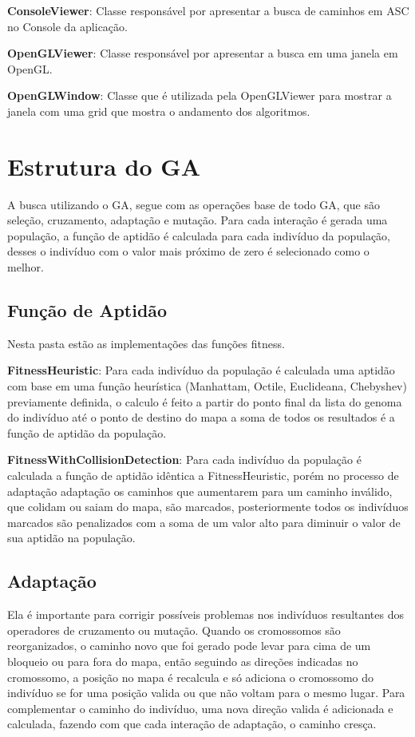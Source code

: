  \textbf{ConsoleViewer}: Classe responsável por apresentar a busca de caminhos em ASC no Console da aplicação.
 
 \textbf{OpenGLViewer}: Classe responsável por apresentar a busca em uma janela em OpenGL.
 
 \textbf{OpenGLWindow}: Classe que é utilizada pela OpenGLViewer para mostrar a janela com uma grid que mostra o andamento dos algoritmos.
 
 \section{Estrutura do GA}
 
 A busca utilizando o GA, segue com as operações base de todo GA, que são seleção, cruzamento, adaptação e mutação. 
 Para cada interação é gerada uma população, a função de aptidão é calculada para cada indivíduo da população, 
 desses o indivíduo com o valor mais próximo de zero é selecionado como o melhor.
 
 \subsection{Função de Aptidão}
 
 Nesta pasta estão as implementações das funções fitness.
 
 \textbf{FitnessHeuristic}: Para cada indivíduo da população é calculada uma aptidão com base em uma função heurística (Manhattam, Octile, Euclideana, Chebyshev)
 previamente definida, o calculo é feito a partir do ponto final da lista do genoma do indivíduo até o ponto de destino do mapa
 a soma de todos os resultados é a função de aptidão da população.
 
 \textbf{FitnessWithCollisionDetection}: Para cada indivíduo da população é calculada a função de aptidão idêntica a FitnessHeuristic, porém no processo de adaptação adaptação os caminhos que aumentarem para um caminho inválido, que colidam ou saiam do mapa, são marcados,
 posteriormente todos os indivíduos marcados são penalizados com a  soma de  um valor alto para diminuir o valor de sua aptidão na população.
 
 \subsection{Adaptação}
 
 Ela é importante para corrigir possíveis problemas nos indivíduos resultantes dos operadores de cruzamento ou mutação. Quando os cromossomos são reorganizados, 
 o caminho novo que foi gerado pode levar para cima de um bloqueio ou para fora do mapa, então seguindo as direções indicadas no cromossomo, 
 a posição no mapa é recalcula e só adiciona o cromossomo do indivíduo se for uma posição valida ou que não voltam para o mesmo lugar.
 Para complementar o caminho do indivíduo, uma nova direção valida é adicionada e calculada, fazendo com que cada interação de adaptação, o caminho cresça.
 
